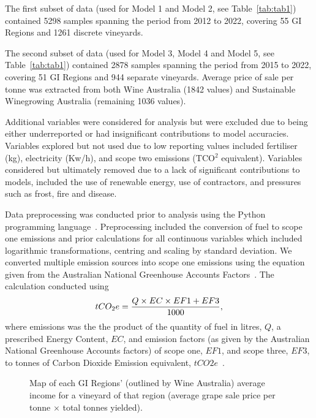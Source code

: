 \documentclass[10pt,letterpaper]{article}
\begin{document}
\par
The first subset of data (used for Model 1 and Model 2, see Table~\ref{tab:tab1}) contained 5298 samples spanning the period from 2012 to 2022, covering 55 GI Regions and 1261 discrete vineyards.
\par
The second subset of data (used for Model 3, Model 4 and Model 5, see Table~\ref{tab:tab1}) contained 2878 samples spanning the period from 2015 to 2022, covering 51 GI Regions and 944 separate vineyards. Average price of sale per tonne was extracted from both Wine Australia (1842 values) and Sustainable Winegrowing Australia (remaining 1036 values).
\par
Additional variables were considered for analysis but were excluded due to being either underreported or had insignificant contributions to model accuracies. Variables explored but not used due to low reporting values included fertiliser (kg), electricity (Kw/h), and scope two emissions (TCO$^2$ equivalent). Variables considered but ultimately removed due to a lack of significant contributions to models, included the use of renewable energy, use of contractors, and pressures such as frost, fire and disease.
\par
Data preprocessing was conducted prior to analysis using the Python programming language~\cite{g.vanrossumPythonTutorialTechnical1995}. Preprocessing included the conversion of fuel to scope one emissions and prior calculations for all continuous variables which included logarithmic transformations, centring and scaling by standard deviation. 
We converted multiple emission sources into scope one emissions using the equation given from the Australian National Greenhouse Accounts Factors~\cite{agdeeNationalGreenhouseAccounts2021}. The calculation conducted using
\begin{equation}
\label{(1)}
    tCO_{2}e={{Q \times EC \times EF1 + EF3}\over{1000}},
\end{equation}
where emissions was the the product of the quantity of fuel in litres, $Q$, a prescribed Energy Content, $EC$, and emission factors (as given by the Australian National Greenhouse Accounts factors) of scope one, $EF1$, and scope three, $EF3$, to tonnes of Carbon Dioxide Emission equivalent, $tCO2e$~\cite{departmentofclimatechangeenergytheenvironmentandwaterAustralianNationalGreenhouse2022}.
\par
\begin{figure}[htb]
  \caption{Map of each GI Regions' (outlined by Wine Australia) average income for a vineyard of that region (average grape sale price per tonne $\times$ total tonnes yielded).}\label{fig:map}
\end{figure}%
\end{document}
